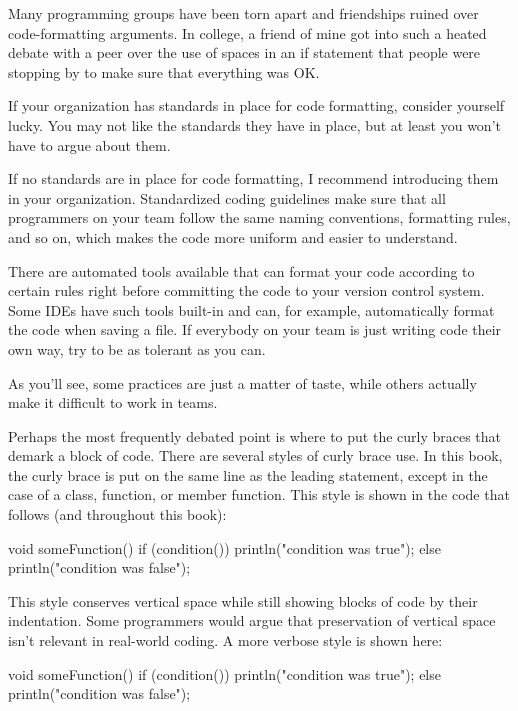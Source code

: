 
Many programming groups have been torn apart and friendships ruined over code-formatting arguments. In college, a friend of mine got into such a heated debate with a peer over the use of spaces in an if statement that people were stopping by to make sure that everything was OK.

If your organization has standards in place for code formatting, consider yourself lucky. You may not like the standards they have in place, but at least you won’t have to argue about them.

If no standards are in place for code formatting, I recommend introducing them in your organization. Standardized coding guidelines make sure that all programmers on your team follow the same naming conventions, formatting rules, and so on, which makes the code more uniform and easier to understand.

There are automated tools available that can format your code according to certain rules right before committing the code to your version control system. Some IDEs have such tools built-in and can, for example, automatically format the code when saving a file.
If everybody on your team is just writing code their own way, try to be as tolerant as you can.

As you’ll see, some practices are just a matter of taste, while others actually make it difficult to work in teams.


Perhaps the most frequently debated point is where to put the curly braces that demark a block of code. There are several styles of curly brace use. In this book, the curly brace is put on the same line as the leading statement, except in the case of a class, function, or member function. This style is shown in the code that follows (and throughout this book):

\begin{cpp}
void someFunction()
{
    if (condition()) {
        println("condition was true");
    } else {
        println("condition was false");
    }
}
\end{cpp}

This style conserves vertical space while still showing blocks of code by their indentation. Some programmers would argue that preservation of vertical space isn’t relevant in real-world coding. A more verbose style is shown here:

\begin{cpp}
void someFunction()
{
    if (condition())
    {
        println("condition was true");
    }
    else
    {
        println("condition was false");
    }
}
\end{cpp}

